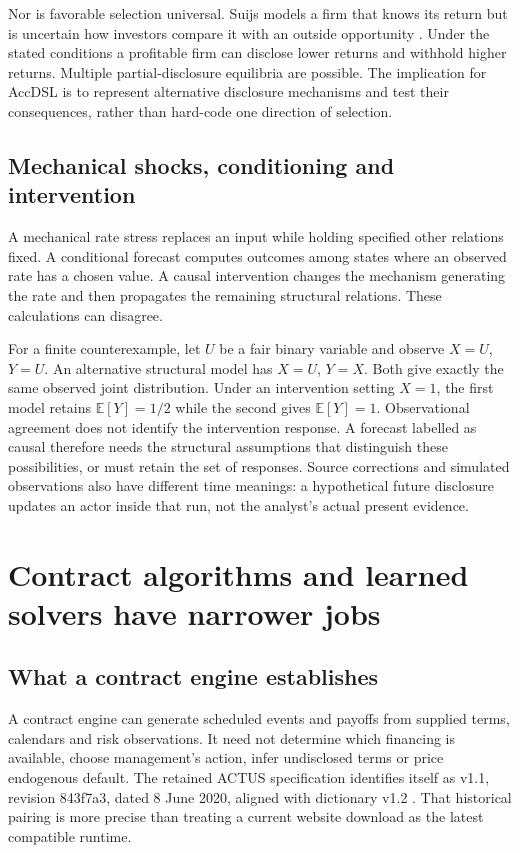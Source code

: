 \documentclass[11pt,a4paper]{article}
\newcommand{\E}{\mathbb E}
\begin{document}
Nor is favorable selection universal. Suijs models a firm that knows its
return but is uncertain how investors compare it with an outside opportunity
\cite[Sections~3--4, Proposition~2 and Appendices~A--B]{suijs}. Under the
stated conditions a profitable firm can disclose lower returns and withhold
higher returns. Multiple partial-disclosure equilibria are possible. The
implication for AccDSL is to represent alternative disclosure mechanisms and
test their consequences, rather than hard-code one direction of selection.

\subsection{Mechanical shocks, conditioning and intervention}
A mechanical rate stress replaces an input while holding specified other
relations fixed. A conditional forecast computes outcomes among states where
an observed rate has a chosen value. A causal intervention changes the
mechanism generating the rate and then propagates the remaining structural
relations. These calculations can disagree.

For a finite counterexample, let $U$ be a fair binary variable and observe
$X=U$, $Y=U$. An alternative structural model has $X=U$, $Y=X$. Both give
exactly the same observed joint distribution. Under an intervention setting
$X=1$, the first model retains $\E[Y]=1/2$ while the second gives
$\E[Y]=1$. Observational agreement does not identify the intervention
response. A forecast labelled as causal therefore needs the structural
assumptions that distinguish these possibilities, or must retain the set of
responses. Source corrections and simulated observations also have different
time meanings: a hypothetical future disclosure updates an actor inside that
run, not the analyst's actual present evidence.

\section{Contract algorithms and learned solvers have narrower jobs}
\subsection{What a contract engine establishes}
A contract engine can generate scheduled events and payoffs from supplied
terms, calendars and risk observations. It need not determine which financing
is available, choose management's action, infer undisclosed terms or price
endogenous default. The retained ACTUS specification identifies itself as
v1.1, revision 843f7a3, dated 8 June 2020, aligned with dictionary v1.2
\cite{actus}. That historical pairing is more precise than treating a current
website download as the latest compatible runtime.
\end{document}
